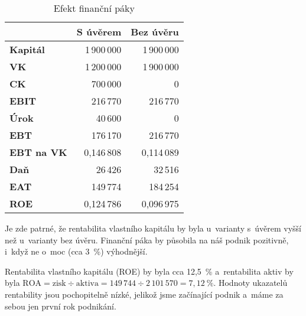 \begin{table}[htbp]
\begin{center}
\begin{tabular}{ l | r r }
& \multicolumn{1}{|c}{\textbf{S úvěrem}\index{úvěr}} & \multicolumn{1}{l}{\textbf{Bez úvěru}\index{úvěr}} \\ \hline
\textbf{Kapitál}              & 1\,900\,000                             & 1\,900\,000                              \\
\textbf{VK}                   & 1\,200\,000                             & 1\,900\,000                              \\
\textbf{CK}                   & 700\,000                               & 0                                      \\
\textbf{EBIT\index{EBIT}}                 & 216\,770                               & 216\,770                                \\
\textbf{Úrok}                 & 40\,600                                & 0                                      \\
\textbf{EBT}                  & 176\,170                               & 216\,770                                \\
\textbf{EBT na VK}            & 0,146\,808                              & 0,114\,089                               \\
\textbf{Daň}                  & 26\,426                                & 32\,516                                 \\
\textbf{EAT\index{EAT}}                  & 149\,774                               & 184\,254                                \\
\textbf{ROE}                  & 0,124\,786                              & 0,096\,975                              
\end{tabular}
\caption{Efekt finanční páky \cite{mikovcova_schollerova}}
\label{efekt_financni_paky}
\end{center}
\end{table}

Je zde patrné, že rentabilita vlastního kapitálu by byla u~varianty s~úvěrem vyšší než u~varianty bez úvěru. Finanční páka by působila na náš podnik pozitivně, i~když ne o~moc (cca 3~\%) výhodnější.

Rentabilita vlastního kapitálu (ROE) by byla cca 12,5~\% a~rentabilita aktiv by byla $ \text{ROA} = \text{zisk} \div \text{aktiva} = 149\,744 \div 2\,101\,570 = 7,12~\%$. Hodnoty ukazatelů rentability jsou pochopitelně nízké, jelikož jsme začínající podnik a~máme za sebou jen první  rok podnikání.





